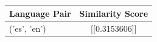 \begin{tabular}{|l|c|}
\hline
Language Pair & Similarity Score \\
\hline
('es', 'en') & [[0.3153606]] \\
\hline
\end{tabular}

